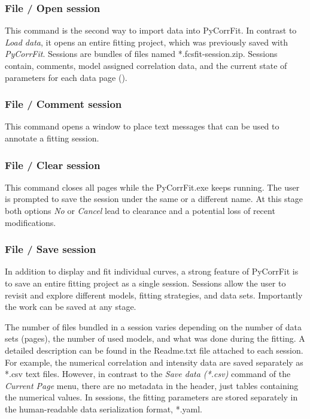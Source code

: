 \subsubsection{File / Open session}
\label{sec:fm.os}
This command is the second way to import data into PyCorrFit. In contrast to \textit{Load data}, it opens an entire fitting project, which was previously saved with \textit{PyCorrFit}. Sessions are bundles of files named *.fcsfit-session.zip. Sessions contain, comments, model assigned correlation data, and the current state of parameters for each data page ().

\subsubsection{File / Comment session}
\label{sec:fm.cs}
This command opens a window to place text messages that can be used to annotate a fitting session.

\subsubsection{File / Clear session}
\label{sec:cls}
This command closes all pages while the PyCorrFit.exe keeps running. The user is prompted to save the session under the same or a different name. At this stage both options \textit{No} or \textit{Cancel} lead to clearance and a potential loss of recent modifications.

\subsubsection{File / Save session}
\label{sec:fm.ss}
In addition to display and fit individual curves, a strong feature of PyCorrFit is to save an entire fitting project as a single session. Sessions allow the user to revisit and explore different models, fitting strategies, and data sets. Importantly the work can be saved at any stage.

The number of files bundled in a session varies depending on the number of data sets (pages), the number of used models, and what was done during the fitting. A detailed description can be found in the Readme.txt file attached to each session. For example, the numerical correlation and intensity data are saved separately as *.csv text files. However, in contrast to the \textit{Save data (*.csv)} command of the \textit{Current Page} menu, there are no metadata in the header, just tables containing the numerical values. In sessions, the fitting parameters are stored separately in the human-readable data serialization format, *.yaml.

